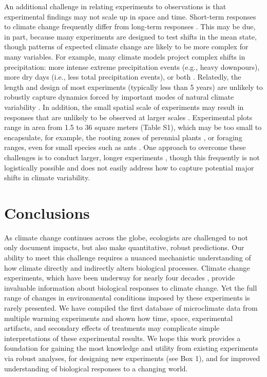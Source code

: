 \documentclass{article}
\begin{document}
\par An additional challenge in relating experiments to observations is that experimental findings may not scale up in space and time. Short-term responses to climate change frequently differ from long-term responses \citep{woodward1992,elmendorf2012, andresen2016, reich2018}. This may be due, in part, because many experiments are designed to test shifts in the mean state, though patterns of expected climate change are likely to be more complex for many variables. For example, many climate models project complex shifts in precipitation: more intense extreme precipitation events (e.g., heavy downpours), more dry days (i.e., less total precipitation events), or both \citep{polade2014}. Relatedly, the length and design of most experiments (typically less than 5 years) are unlikely to robustly capture dynamics forced by important modes of natural climate variability \citep[e.g., El Ni{\~n}o and La Ni{\~n}a events][]{holmgren2001}. In addition, the small spatial scale of experiments may result in responses that are unlikely to be observed at larger scales \citep{woodward1992,menke2014}. Experimental plots range in area from 1.5 to 36 square meters (Table S1), which may be too small to encapsulate, for example, the rooting zones of perennial plants \citep{canadell1996}, or foraging ranges, even for small species such as ants \citep{menke2014}. One approach to overcome these challenges is to conduct larger, longer experiments \citep{woodward1992}, though this frequently is not logistically possible and does not easily address how to capture potential major shifts in climate variability. %
\section* {Conclusions}
\par As climate change continues across the globe, ecologists are challenged to not only document impacts, but also make quantitative, robust predictions. Our ability to meet this challenge requires a nuanced mechanistic understanding of how climate directly and indirectly alters biological processes. Climate change experiments, which have been underway for nearly four decades \citep[e.g.,][]{tamaki1981,carlson1982,melillo2017}, provide invaluable information about biological responses to climate change. Yet the full range of changes in environmental conditions imposed by these experiments is rarely presented. We have compiled the first database of microclimate data from multiple warming experiments and shown how time, space, experimental artifacts, and secondary effects of treatments may complicate simple interpretations of these experimental results. We hope this work provides a foundation for gaining the most knowledge and utility from existing experiments via robust analyses, for designing new experiments (see Box 1), and for improved understanding of biological responses to a changing world.
\end{document}
